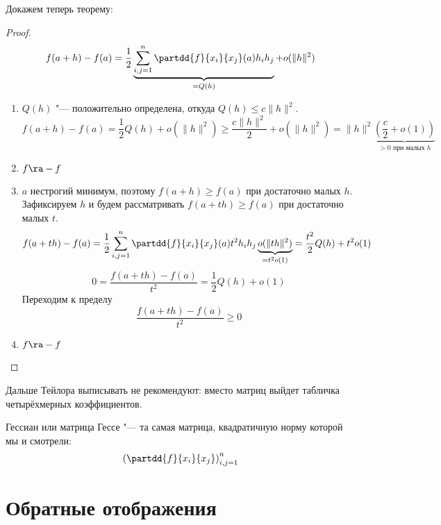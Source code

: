 Докажем теперь теорему:
\begin{proof}
	\[ f(a + h) - f(a) = \frac12 \underbrace{\sum_{i,j = 1}^n \partdd{f}{x_i}{x_j}(a) h_ih_j}_{=Q(h)} + o(\|h\|^2) \]
	\begin{enumerate}
	\item
		$Q(h)$ "--- положительно определена, откуда $Q(h) \le c \|h\|^2$.
		\[  f(a+h) - f(a) = \frac12 Q(h) + o(\|h\|^2) \ge \frac{c\|h\|^2}2 + o(\|h\|^2) = \|h\|^2 \underbrace{\left(\frac{c}2 + o(1)\right)}_{\text{$>0$ при малых $h$}} \]

	\item $f \ra -f$

	\item
		$a$ нестрогий минимум, поэтому $f(a+h) \ge f(a)$ при достаточно малых $h$.
		Зафиксируем $h$ и будем рассматривать $f(a+th) \ge f(a)$ при достаточно малых $t$.
		\[ f(a+th) - f(a) = \frac12 \sum_{i,j = 1}^n \partdd{f}{x_i}{x_j}(a) t^2h_ih_j \underbrace{o(\|th\|^2)}_{=t^2o(1)} = \frac{t^2}2 Q(h) + t^2o(1)\]
		\[ 0 = \frac{f(a+th) - f(a)}{t^2} = \frac12 Q(h) + o(1) \]
		Переходим к пределу
		\[ \frac{f(a+th) - f(a)}{t^2} \ge 0 \]

	\item $f \ra -f$
	\end{enumerate}
\end{proof}

Дальше Тейлора выписывать не рекомендуют: вместо матриц выйдет табличка четырёхмерных коэффициентов.

\begin{Def}
	Гессиан или матрица Гессе "--- та самая матрица, квадратичную норму которой мы и смотрели:
	\[ \left( \partdd{f}{x_i}{x_j}\right)_{i,j=1}^n \]
\end{Def}

\section{Обратные отображения}

